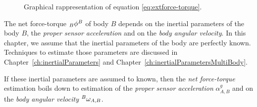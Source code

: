 \begin{figure}
\caption{Graphical rappresentation of equation \eqref{eq:extforce-torque}.}
\label{fig:extFTsSingleBody}
\end{figure}

The net force-torque $\hspace{0em}_B \phi^B$ of body $B$ depends on the inertial parameters of the body $B$, the \emph{proper sensor acceleration} and on the \emph{body angular velocity}. In this chapter, we assume that the inertial parameters of the body are perfectly known. Techniques to estimate those parameters are discussed in Chapter~\ref{ch:inertialParameters} and Chapter~\ref{ch:inertialParametersMultiBody}. 

If these inertial parameters are assumed to known, then the \emph{net force-torque} estimation boils down to estimation of the \emph{proper sensor acceleration} $\alpha_{A,B}^g$ and on the \emph{body angular velocity} $\hspace{0em}^B \omega_{A,B}$.

